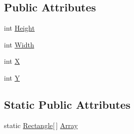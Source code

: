 \subsection*{Public Attributes}
\begin{DoxyCompactItemize}
\item 
int \hyperlink{structMicrosoft_1_1Xna_1_1Framework_1_1Rectangle_aaadefba794062a2ca7e58ceb10b955a1}{Height}
\item 
int \hyperlink{structMicrosoft_1_1Xna_1_1Framework_1_1Rectangle_abbe7749c3b402f7dfe64f936774cfcd4}{Width}
\item 
int \hyperlink{structMicrosoft_1_1Xna_1_1Framework_1_1Rectangle_a80c0944640e62d3ed6c5419c1bcc0c88}{X}
\item 
int \hyperlink{structMicrosoft_1_1Xna_1_1Framework_1_1Rectangle_aa482c4cc86a24474e4fb19b5b5978778}{Y}
\end{DoxyCompactItemize}
\subsection*{Static Public Attributes}
\begin{DoxyCompactItemize}
\item 
static \hyperlink{structMicrosoft_1_1Xna_1_1Framework_1_1Rectangle}{Rectangle}\mbox{[}$\,$\mbox{]} \hyperlink{structMicrosoft_1_1Xna_1_1Framework_1_1Rectangle_a6f73a28e857b57b1fa99194ab97b5dec}{Array}
\end{DoxyCompactItemize}
